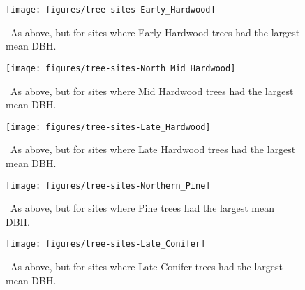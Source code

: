 \clearpage

\begin{figure}[ht]
  \centering
  \texttt{[image: figures/tree-sites-Early\_Hardwood]}
  \caption{\label{fig:tree-sites-EH}\
    As above, but for sites where Early Hardwood trees had the largest mean DBH.
  }
\end{figure}

\clearpage

\begin{figure}[ht]
  \centering
  \texttt{[image: figures/tree-sites-North\_Mid\_Hardwood]}
  \caption{\label{fig:tree-sites-MH}\
    As above, but for sites where Mid Hardwood trees had the largest mean DBH.
  }
\end{figure}

\clearpage

\begin{figure}[ht]
  \centering
  \texttt{[image: figures/tree-sites-Late\_Hardwood]}
  \caption{\label{fig:tree-sites-LH}\
    As above, but for sites where Late Hardwood trees had the largest mean DBH.
  }
\end{figure}

\clearpage

\begin{figure}[ht]
  \centering
  \texttt{[image: figures/tree-sites-Northern\_Pine]}
  \caption{\label{fig:tree-sites-P}\
    As above, but for sites where Pine trees had the largest mean DBH.
  }
\end{figure}

\clearpage

\begin{figure}[ht]
  \centering
  \texttt{[image: figures/tree-sites-Late\_Conifer]}
  \caption{\label{fig:tree-sites-LC}\
    As above, but for sites where Late Conifer trees had the largest mean DBH.
  }
\end{figure}

